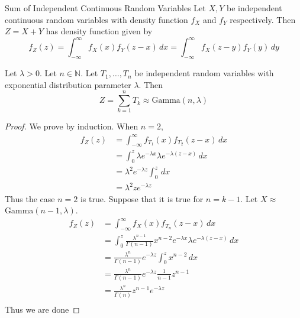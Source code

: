 \documentclass[a4paper]{article}
\begin{document}
\begin{thm}{Sum of Independent Continuous Random Variables}{} Let $X,Y$ be independent continuous random variables with density function $f_X$ and $f_Y$ respectively. Then $Z=X+Y$ has density function given by $$f_Z(z)=\int_{-\infty}^{\infty}f_X(x)f_Y(z-x)\,dx=\int_{-\infty}^{\infty}f_X(z-y)f_Y(y)\,dy$$
\end{thm}

\begin{prp}{}{} Let $\lambda>0$. Let $n\in\mathbb{N}$. Let $T_1,\dots,T_n$ be independent random variables with exponential distribution parameter $\lambda$. Then $$Z=\sum_{k=1}^nT_k\approx\text{Gamma}(n,\lambda)$$
\end{prp}
\begin{proof} We prove by induction. When $n=2$, 
\begin{align*}
f_Z(z)&=\int_{-\infty}^\infty f_{T_1}(x)f_{T_2}(z-x)\,dx\\
&=\int_0^z\lambda e^{-\lambda x}\lambda e^{-\lambda(z-x)}\,dx\\
&=\lambda^2e^{-\lambda z}\int_0^z\,dx\\
&=\lambda^2ze^{-\lambda z}
\end{align*} Thus the case $n=2$ is true. Suppose that it is true for $n=k-1$. Let $X\approx$Gamma$(n-1,\lambda)$. 
\begin{align*}
f_Z(z)&=\int_{-\infty}^\infty f_X(x)f_{T_n}(z-x)\,dx\\
&=\int_0^z\frac{\lambda^{n-1}}{\Gamma(n-1)}x^{n-2}e^{-\lambda x}\lambda e^{-\lambda(z-x)}\,dx\\
&=\frac{\lambda^{n}}{\Gamma(n-1)}e^{-\lambda z}\int_0^zx^{n-2}\,dx\\
&=\frac{\lambda^{n}}{\Gamma(n-1)}e^{-\lambda z}\frac{1}{n-1}z^{n-1}\\
&=\frac{\lambda^{n}}{\Gamma(n)}z^{n-1}e^{-\lambda z}\\
\end{align*} Thus we are done
\end{proof}
\end{document}
